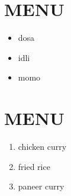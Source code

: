 \documentclass{article}
\begin{document}
\section{MENU}
\begin{itemize}
\item dosa
\item idli
\item momo
\end{itemize}
\section{MENU}
\begin{enumerate}
\item chicken curry
\item fried rice
\item paneer curry
\end{enumerate}
\end{document}
